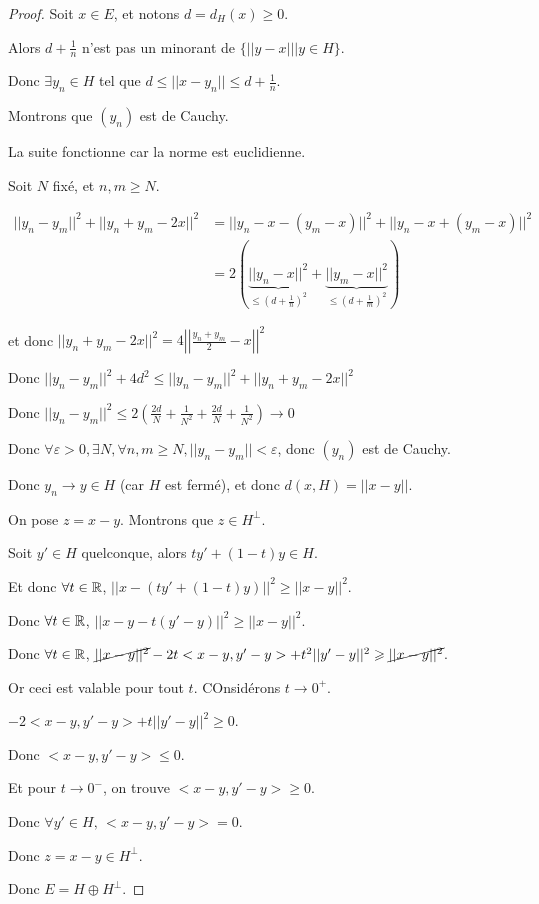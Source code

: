 \begin{proof}
    Soit $x \in E$, et notons $d = d_H(x) \geqslant 0$. 

    Alors $d + \frac 1 n$ n'est pas un minorant de $\{ ||y - x|| | y \in H \}$.

    Donc $\exists y_n \in H$ tel que $d \leqslant ||x - y_n|| \leqslant d + \frac 1 n$.

    Montrons que $(y_n)$ est de Cauchy.

    \svspace La suite fonctionne car la norme est euclidienne. 

    Soit $N$ fixé, et $n, m \geqslant N$.

    \begin{align*}
        ||y_n - y_m||^2 + ||y_n + y_m - 2x||^2 & = ||y_n - x - (y_m - x)||^2 + ||y_n - x + (y_m - x)||^2 \\
        & = 2 (\underbrace{||y_n - x||^2}_{\leqslant (d + \frac 1 n)^2} +  \underbrace{||y_m - x||^2}_{\leqslant (d + \frac 1 m)^2}) 
    \end{align*}

    et donc $||y_n + y_m - 2x||^2  =  4 \left|\left| \frac{y_n + y_m}{2} - x \right|\right|^2$

    Donc $||y_n - y_m||^2 + 4 d^2 \leqslant ||y_n - y_m||^2 + ||y_n + y_m - 2x||^2 $

    Donc $||y_n - y_m||^2 \leqslant 2 \left( \frac{2d}{N} + \frac{1}{N^2}  + \frac{2d}{N} + \frac{1}{N^2} \right) \to 0$

    Donc $\forall \varepsilon > 0, \exists N, \forall n, m \geqslant N, ||y_n - y_m|| < \varepsilon$, donc $(y_n)$ est de Cauchy.

    Donc $y_n \to y \in H$ (car $H$ est fermé), et donc $d(x, H) = ||x - y||$.

    \avspace On pose $z = x - y$. Montrons que $z \in H^\perp$.

    Soit $y' \in H$ quelconque, alors $ty' + (1 - t) y \in H$.

    Et donc $\forall t \in \mathbb{R}$, $||x - (ty' + (1 - t)y)||^2 \geqslant ||x - y||^2$.

    Donc $\forall t \in \mathbb{R}$, $||x - y - t(y' - y)||^2 \geqslant ||x - y||^2$.

    Donc $\forall t \in \mathbb{R}$, $\cancel{||x - y||^2} - 2t <x - y, y' - y> + t^2 ||y' - y||^2 \geqslant \cancel{||x - y||^2}$.

    Or ceci est valable pour tout $t$. COnsidérons $t \to 0^+$. 

    $-2<x - y, y' - y> + t||y' - y||^2 \geqslant 0$.

    Donc $<x - y, y' - y> \leqslant 0$.

    Et pour $t \to 0^-$, on trouve $<x - y, y' - y> \geqslant 0$.

    Donc $\forall y' \in H, \, <x - y, y' - y> = 0$.

    Donc $z = x - y \in H^\perp$.

    Donc $E = H \oplus H^\perp$.


\end{proof}


